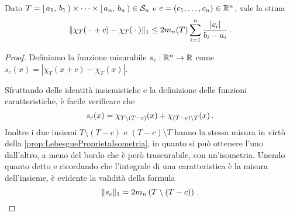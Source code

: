 \begin{lemma}\label{lemma:ContinuitaL1Semianello}
	Dato $T=\left[\,a_1,\,b_1\,\right)\times\cdots\times\left[\,a_n,\,b_n\,\right)\in\mathcal S_n$ e $c=(c_1,\dots,c_n)\in\mathbb R^n$, vale la stima
	\begin{equation*}
		\Vert \chi_T({}\cdot{}+c)-\chi_T({}\cdot{})\Vert_1\le 2m_n(T)\sum_{i=1}^n \frac{\lvert c_i\rvert }{b_i-a_i} \, \text{. }
	\end{equation*}
\end{lemma}
\begin{proof}
	Definiamo la funzione misurabile $s_c:\mathbb R^n\to\mathbb R$ come $s_c(x)=\left\lvert\chi_T(x+c)-\chi_T(x)\right\rvert$.
	
	Sfruttando delle identità insiemistiche e la definizione delle funzioni caratteristiche, è facile verificare che
	\begin{equation*}
		s_c(x)=\chi_{T\setminus\left(T-c\right)}(x)+\chi_{\left(T-c\right)\setminus T}(x)\, \text{. }
	\end{equation*}
	Inoltre i due insiemi $T\setminus\left(T-c\right)$ e $\left(T-c\right)\setminus T$ hanno la stessa misura in virtù della \cref{prop:LebesgueProprietaIsometria}, in quanto si può ottenere l'uno dall'altro, a meno del bordo che è però trascurabile, con un'isometria.
	Unendo quanto detto e ricordando che l'integrale di una caratteristica è la misura dell'insieme, è evidente la validità della formula
	\begin{equation} \label{eq:IdentitaIntegraleContinuitaL1}
		\Vert s_c\Vert_1=2m_n\left(T\setminus\left(T-c\right)\right)\, \text{. }
	\end{equation}
	

\end{proof}
